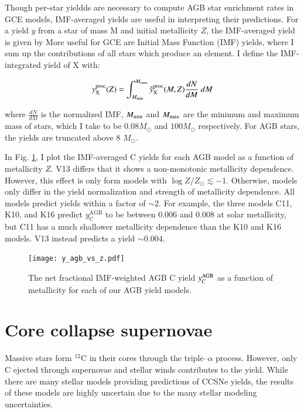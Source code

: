 \documentclass[12pt,oneside]{report}
\newcommand{\Ycagb}{\ensuremath{y_{\rm C}^{\rm AGB}}}
\newcommand{\sun}{\ensuremath{\odot}}
\begin{document}
Though per-star yieldds are necessary to compute AGB star enrichment rates in GCE models, IMF-averaged yields are useful in interpreting their predictions. For a yield $y$ from a star of mass M and initial metallicity $Z$, the IMF-averaged yield is given by 
More useful for GCE are Initial Mass Function (IMF) yields, where I sum up the
contributions of all stars which produce an element.
I define the IMF-integrated yield of X with: 


\begin{equation} \label{eq:imf-yield}
    y_{\rm X}^{\rm proc}(Z) = 
    \int_{M_{\rm min}}^{M_{\rm max}} 
    \tilde{y}_{\rm X}^{\rm proc}(M, Z)
    \frac{dN}{dM}  \ dM
\end{equation}

where $\frac{dN}{dM}$ is the normalized IMF, $M_{\rm min}$ and $M_{\rm max}$ are the minimum and maximum mass of stars, which I take to be $0.08 M_{\sun}$ and $100 M_{\sun}$ respectively. For AGB stars, the yields are truncated above 8 $M_{\odot}$. 

In Fig. \ref{fig:yagb-z}, I plot the IMF-averaged C yields for each AGB model as a function of metallicity $Z$.
V13 differs that it shows a non-monotonic metallicity dependence. However, this effect is only form models with $\log Z/Z_\odot \lesssim -1$.
Otherwise, models only differ in the yield normalization and strength of metallicity dependence. All models predict yields within a factor of $\sim 2$.
For example, the three models C11, K10, and K16 predict $y_\text{C}^\text{AGB}$ to be between 0.006 and 0.008 at solar metallicity, but C11 has a much shallower metallicity dependence than the K10 and K16 models. V13 instead predicts a yield $\sim 0.004$.

\begin{figure}
    \centering
    \texttt{[image: y\_agb\_vs\_z.pdf]}

    \caption[AGB yield metallicity dependence]{The net fractional IMF-weighted AGB C yield $\Ycagb$ as a function of metallicity for each of our AGB yield models.
    }
    \label{fig:yagb-z}
\end{figure}

\section{Core collapse supernovae}


Massive stars form $^{12}$C in their cores through the triple--$\alpha$ process. However, only C ejected through supernovae and stellar winds contributes to the yield. 
While there are many stellar models providing predictions of CCSNe yields, the results of these models are highly uncertain due to the many stellar modeling uncertainties. 
\end{document}

